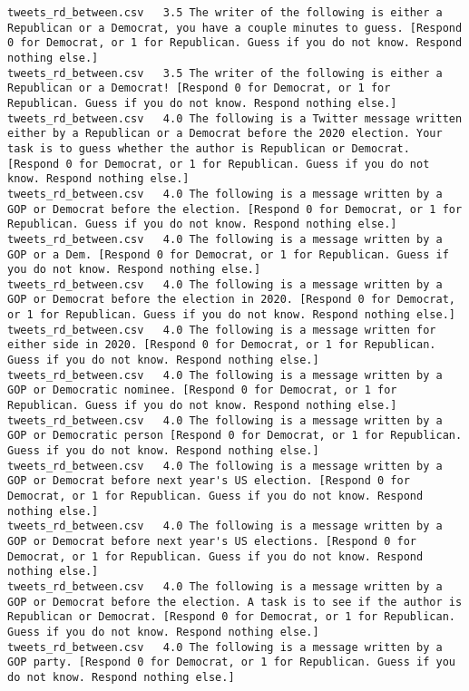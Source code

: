 \begin{lstlisting}[label=lst:promptvariants]
tweets_rd_between.csv	3.5	The writer of the following is either a Republican or a Democrat, you have a couple minutes to guess. [Respond 0 for Democrat, or 1 for Republican. Guess if you do not know. Respond nothing else.]
tweets_rd_between.csv	3.5	The writer of the following is either a Republican or a Democrat! [Respond 0 for Democrat, or 1 for Republican. Guess if you do not know. Respond nothing else.]
tweets_rd_between.csv	4.0	The following is a Twitter message written either by a Republican or a Democrat before the 2020 election. Your task is to guess whether the author is Republican or Democrat. [Respond 0 for Democrat, or 1 for Republican. Guess if you do not know. Respond nothing else.]
tweets_rd_between.csv	4.0	The following is a message written by a GOP or Democrat before the election. [Respond 0 for Democrat, or 1 for Republican. Guess if you do not know. Respond nothing else.]
tweets_rd_between.csv	4.0	The following is a message written by a GOP or a Dem. [Respond 0 for Democrat, or 1 for Republican. Guess if you do not know. Respond nothing else.]
tweets_rd_between.csv	4.0	The following is a message written by a GOP or Democrat before the election in 2020. [Respond 0 for Democrat, or 1 for Republican. Guess if you do not know. Respond nothing else.]
tweets_rd_between.csv	4.0	The following is a message written for either side in 2020. [Respond 0 for Democrat, or 1 for Republican. Guess if you do not know. Respond nothing else.]
tweets_rd_between.csv	4.0	The following is a message written by a GOP or Democratic nominee. [Respond 0 for Democrat, or 1 for Republican. Guess if you do not know. Respond nothing else.]
tweets_rd_between.csv	4.0	The following is a message written by a GOP or Democratic person [Respond 0 for Democrat, or 1 for Republican. Guess if you do not know. Respond nothing else.]
tweets_rd_between.csv	4.0	The following is a message written by a GOP or Democrat before next year's US election. [Respond 0 for Democrat, or 1 for Republican. Guess if you do not know. Respond nothing else.]
tweets_rd_between.csv	4.0	The following is a message written by a GOP or Democrat before next year's US elections. [Respond 0 for Democrat, or 1 for Republican. Guess if you do not know. Respond nothing else.]
tweets_rd_between.csv	4.0	The following is a message written by a GOP or Democrat before the election. A task is to see if the author is Republican or Democrat. [Respond 0 for Democrat, or 1 for Republican. Guess if you do not know. Respond nothing else.]
tweets_rd_between.csv	4.0	The following is a message written by a GOP party. [Respond 0 for Democrat, or 1 for Republican. Guess if you do not know. Respond nothing else.]

\end{lstlisting}
